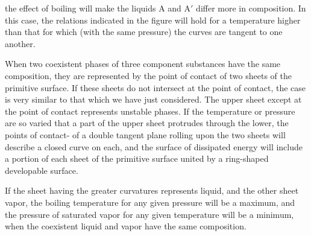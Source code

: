 \documentclass[12pt]{article}
\begin{document}
the effect of boiling will make the liquids A and A$'$ differ more in composition. In this case, the relations indicated in the figure will hold for a temperature higher than that for which (with the same pressure) the curves are tangent to one another.


When two coexistent phases of three component substances have the same composition, they are represented by the point of contact of two sheets of the primitive surface. If these sheets do not intersect at the point of contact, the case is very similar to that which we have just considered. The upper sheet except at the point of contact represents unstable phases. If the temperature or pressure are so varied that a part of the upper sheet protrudes through the lower, the points of contact- of a double tangent plane rolling upon the two sheets will describe a closed curve on each, and the surface of dissipated energy will include a portion of each sheet of the primitive surface united by a ring-shaped developable surface.


If the sheet having the greater curvatures represents liquid, and the other sheet vapor, the boiling temperature for any given pressure will be a maximum, and the pressure of saturated vapor for any given temperature will be a minimum, when the coexistent liquid and vapor have the same composition.
\end{document}
